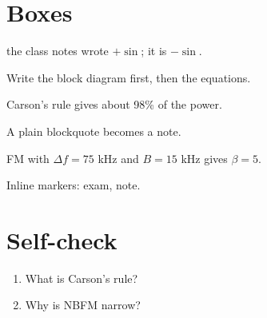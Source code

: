 

\section{Boxes}
\label{sec:boxes}

\begin{warnbox}

the class notes wrote $+\sin$; it is $-\sin$.

\end{warnbox}

\begin{exambox}

Write the block diagram first, then the equations.

\end{exambox}

\begin{notebox}

Carson's rule gives about 98\% of the power.

\end{notebox}

\begin{notebox}

A plain blockquote becomes a note.

\end{notebox}

\begin{examplebox}[Example 2]

FM with $\Delta f = 75$ kHz and $B = 15$ kHz gives $\beta = 5$.

\end{examplebox}

Inline markers: \exammark{} exam, \pinmark{} note.


\section{Self-check}
\label{sec:self_check}

\begin{selfcheckbox}

\begin{enumerate}
    \item What is Carson's rule?
    \item Why is NBFM narrow?
\end{enumerate}

\end{selfcheckbox}

